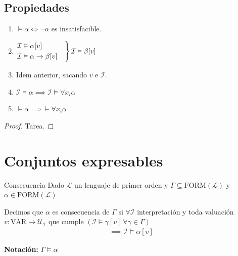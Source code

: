     \subsection{Propiedades}

    \begin{enumerate}
        \item $\vDash \alpha \iff \neg \alpha$ es insatisfacible.
        \item $\begin{rcases*}
                \mathcal{I} \vDash \alpha[v] & \\
                \mathcal{I} \vDash \alpha \to \beta[v] &
            \end{rcases*}
            \mathcal{I} \vDash \beta[v]$
        \item Idem anterior, sacando $v$ e $\mathcal{I}$.
        \item $\mathcal{I} \vDash \alpha
            \implies
            \mathcal{I} \vDash \forall x_i \alpha$
        \item $\vDash \alpha \implies \vDash \forall x_i \alpha$
    \end{enumerate}

    \begin{proof} 
        Tarea.
    \end{proof}

    \section{Conjuntos expresables}

    \begin{definicion}{Consecuencia}{}
        Dado $\mathcal{L}$ un lenguaje de primer orden y 
        $\Gamma \subseteq \mathrm{FORM}(\mathcal{L})$
        y
        $\alpha \in \mathrm{FORM}(\mathcal{L})$

        \medskip

        Decimos que $\alpha$ es consecuencia de $\Gamma$ si
        $\forall \mathcal{I}$ interpretación y toda valuación 
        $v: \mathrm{VAR} \to \mathcal{U}_{\mathcal{I}}$
        que cumple
        $\left(\mathcal{I} \vDash \gamma[v] ~ \forall \gamma \in \Gamma\right)$
        \begin{gather*}
            \implies \mathcal{I} \vDash \alpha [v]
        \end{gather*}

        \bigskip
        \textbf{Notación:}
        $\Gamma \vDash \alpha$
    \end{definicion}

